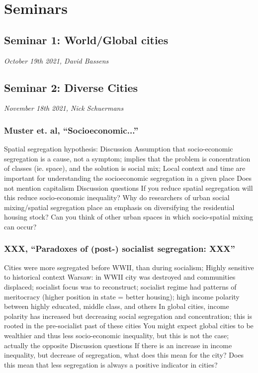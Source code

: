 \documentclass{article}
\begin{document}
\section{Seminars}

\subsection{Seminar 1: World/Global cities}
\textit{October 19th 2021, David Bassens}


\subsection{Seminar 2: Diverse Cities}
\textit{November 18th 2021, Nick Schuermans}

\subsubsection{Muster et. al, ``Socioeconomic...''}
\begin{outline}
	\1 Spatial segregation hypothesis:
		\2 
	\1 Discussion
		\2 Assumption that socio-economic segregation is a cause, not a symptom; implies that the problem is concentration of classes (ie. space), and the solution is social mix; 
		\2 Local context and time are important for understanding the socioeconomic segregation in a given place
		\2 Does not mention capitalism
	\1 Discussion questions
		\2 If you reduce spatial segregation will this reduce socio-economic inequality?
		\2 Why do researchers of urban social mixing/spatial segregation place an emphasis on diversifying the residential housing stock? Can you think of other urban spaces in which socio-spatial mixing can occur?
\end{outline}

\subsubsection{XXX, ``Paradoxes of (post-) socialist segregation: XXX''}
\begin{outline}
	\1 Cities were more segregated before WWII, than during socialism; 
	\1 Highly sensitive to historical context
		\2 Warsaw: in WWII city was destroyed and communities displaced; socialist focus was to reconstruct; socialist regime had patterns of meritocracy (higher position in state = better housing); high income polarity between highly educated, middle class, and others
	\1 In global cities, income polarity has increased but  decreasing social segregation and concentration; this is rooted in the pre-socialist past of these cities
		\2 You might expect global cities to be wealthier and thus less socio-economic inequality, but this is not the case; actually the opposite
	\1 Discussion questions
		\2 If there is an increase in income inequality, but decrease of segregation, what does this mean for the city?
		\2 Does this mean that less segregation is always a positive indicator in cities?
\end{outline}
\end{document}
